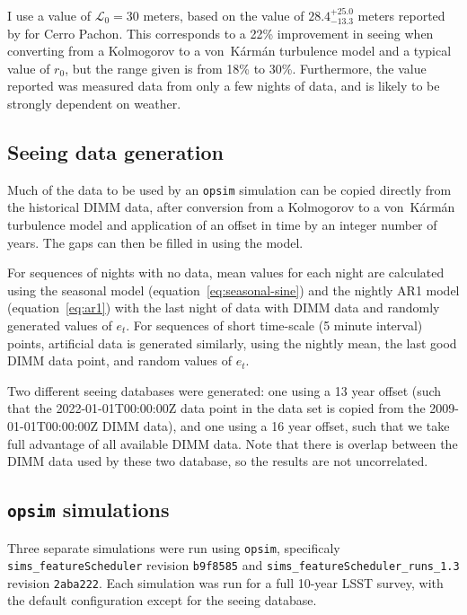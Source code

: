 \documentclass[\docopts]{\docclass}
\begin{document}
I use a value of $\mathcal{L}_0 = 30$ meters, based on the
value of $28.4^{+25.0}_{-13.3}$ meters reported by
\cite{2000ApOpt..39.5415Z} for Cerro Pachon. This corresponds to a 22\%
improvement in seeing when converting from a Kolmogorov to a
von~K\'arm\'an turbulence model and a typical value of $r_0$, but the
range given is from 18\% to 30\%. Furthermore, the value reported was
measured data from only a few nights of data, and is likely to be
strongly dependent on weather.

\subsection{Seeing data generation}
\label{sec:data-generation}

Much of the data to be used by an \texttt{opsim} simulation can be copied
directly from the historical DIMM data, after conversion from a
Kolmogorov to a von~K\'arm\'an turbulence model and application of an
offset in time by an integer number of years. The gaps can then be
filled in using the model.

For sequences of nights with no data, mean values for each night are
calculated using the seasonal model (equation~\ref{eq:seasonal-sine})
and the nightly AR1 model (equation~\ref{eq:ar1}) with the last night
of data with DIMM data and randomly generated values of $e_t$. For
sequences of short time-scale (5 minute interval) points, artificial
data is generated similarly, using the nightly mean, the last good
DIMM data point, and random values of $e_t$.

Two different seeing databases were generated: one using a 13 year
offset (such that the 2022-01-01T00:00:00Z data point in the data set
is copied from the 2009-01-01T00:00:00Z DIMM data), and one using a 16
year offset, such that we take full advantage of all available DIMM
data. Note that there is overlap between the DIMM data used by these
two database, so the results are not uncorrelated.

\subsection{\texttt{opsim} simulations}
\label{sec:simulations}

Three separate simulations were run using \texttt{opsim}, specificaly
\texttt{sims\_featureScheduler} revision \texttt{b9f8585} and
\texttt{sims\_featureScheduler\_runs\_1.3} revision
\texttt{2aba222}. Each simulation was run for a full 10-year LSST
survey, with the default configuration except for the seeing database.
\end{document}

